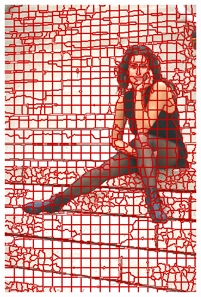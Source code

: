 \begin{figure}
{		\includegraphics[scale=\scalefivebsdtest]{pictures/bsd-test-7-pb}
	}
	\subfigure{
}
\end{figure}
